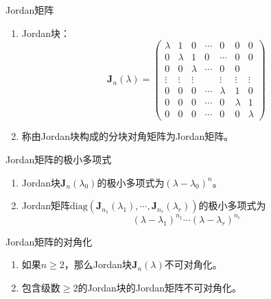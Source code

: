 \documentclass[lang = cn, scheme = chinese, thmcnt = section]{elegantbook}
\newcommand{\bs}{\boldsymbol}          %
\begin{document}
\begin{definition}{Jordan矩阵}
	\begin{enumerate}
		\item Jordan块：
		$$
		\bs{J}_n(\lambda)=\begin{pmatrix}
			\lambda & 1 & 0 & \cdots & 0 & 0 & 0 \\
			0 & \lambda & 1 & 0 & \cdots & 0 & 0 \\
			0 & 0 & \lambda & \cdots & 0 & 0 \\
			\vdots & \vdots & \vdots & & \vdots & \vdots & \vdots \\
			0 & 0 & 0 & \cdots & \lambda & 1 & 0 \\
			0 & 0 & 0 & \cdots & 0 & \lambda & 1 \\
			0 & 0 & 0 & \cdots & 0 & 0 & \lambda
		\end{pmatrix}
		$$
		\item 称由Jordan块构成的分块对角矩阵为Jordan矩阵。
	\end{enumerate}
\end{definition}

\begin{theorem}{Jordan矩阵的极小多项式}
	\begin{enumerate}
		\item Jordan块$\bs{J}_n(\lambda_0)$的极小多项式为$(\lambda-\lambda_0)^n$。
		\item Jordan矩阵$\text{diag}(\bs{J}_{n_1}(\lambda_1),\cdots,\bs{J}_{n_r}(\lambda_r))$的极小多项式为%
		$$
		(\lambda-\lambda_1)^{n_1}\cdots(\lambda-\lambda_r)^{n_r}
		$$
	\end{enumerate}
\end{theorem}

\begin{theorem}{Jordan矩阵的对角化}
	\begin{enumerate}
		\item 如果$n\ge 2$，那么Jordan块$\bs{J}_n(\lambda)$不可对角化。
		\item 包含级数$\ge 2$的Jordan块的Jordan矩阵不可对角化。
	\end{enumerate}
\end{theorem}
\end{document}
